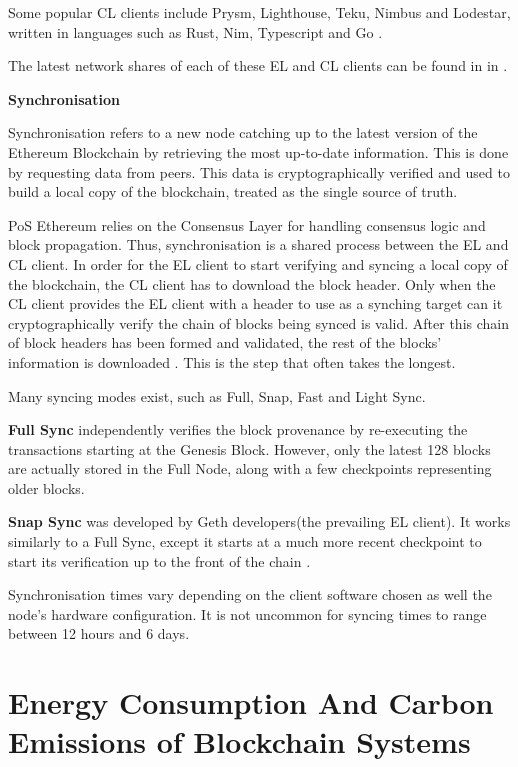 Some popular CL clients include Prysm, Lighthouse, Teku, Nimbus and Lodestar, written in languages such as Rust, Nim, Typescript and Go \cite{EthereumEthereum.org}. 

The latest network shares of each of these EL and CL clients can be found in  in .

\textbf{Synchronisation} 

Synchronisation refers to a new node catching up to the latest version of the Ethereum Blockchain by retrieving the most up-to-date information. This is done by requesting data from peers. This data is cryptographically verified and used to build a local copy of the blockchain, treated as the single source of truth.

PoS Ethereum relies on the Consensus Layer for handling consensus logic and block propagation. Thus, synchronisation is a shared process between the EL and CL client. In order for the EL client to start verifying and syncing a local copy of the blockchain, the CL client has to download the block header. Only when the CL client provides the EL client with a header to use as a synching target can it cryptographically verify the chain of blocks being synced is valid. After this chain of block headers has been formed and validated, the rest of the blocks' information is downloaded \cite{2022DeveloperGo-ethereum}. This is the step that often takes the longest.

Many syncing modes exist, such as Full, Snap, Fast and Light Sync.

\textbf{Full Sync }independently verifies the block provenance by re-executing the transactions starting at the Genesis Block. However, only the latest 128 blocks are actually stored in the Full Node, along with a few checkpoints representing older blocks. 

\textbf{Snap Sync }was developed by Geth developers(the prevailing EL client). It works similarly to a Full Sync, except it starts at a much more recent checkpoint to start its verification up to the front of the chain \cite{2022DeveloperGo-ethereum}.

Synchronisation times vary depending on the client software chosen as well the node's hardware configuration. It is not uncommon for syncing times to range between 12 hours and 6 days.



\section{Energy Consumption And Carbon Emissions of Blockchain Systems}



